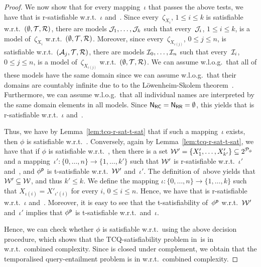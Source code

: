 \begin{proof}
    We now show that for every mapping~$\iota$ that passes the above tests, we
    have that \Wmc is r-satisfiable w.r.t.~$\iota$ and~\Kmc.
    Since every~$\zeta_{X_i}$, $1\le i\le k$ is satisfiable
    w.r.t.~$(\emptyset,\mathcal{T},\mathcal{R})$, there are models $\mathcal{J}_1,\dots,\mathcal{J}_k$ such
    that every~$\mathcal{J}_i$, $1\le i\le k$, is a model of~$\zeta_{X_i}$
    w.r.t.~$(\emptyset,\mathcal{T},\mathcal{R})$.  Moreover, since
    every~$\zeta_{X_{\iota(j)}}$, $0\le j\le n$, is satisfiable
    w.r.t.~$(\mathcal{A}_j,\mathcal{T},\mathcal{R})$, there are models
    $\mathcal{I}_0,\dots,\mathcal{I}_n$ such that every~$\mathcal{I}_i$, $0\le j\le n$, is a model
    of~$\zeta_{X_{\iota(j)}}$ w.r.t.~$(\emptyset,\mathcal{T},\mathcal{R})$.  We can assume
    w.l.o.g.\ that all of these models have the same domain since we can assume
    w.l.o.g.\ that their domains are countably infinite due to to the
    Löwenheim-Skolem theorem~\cite{Loe-MA15,Sko-VS20}.  Furthermore, we can
    assume w.l.o.g.\ that all individual names are interpreted by the same
    domain elements in all models.  Since $\mathsf{N_{RC}}=\mathsf{N_{RR}}=\emptyset$, this yields
    that \Wmc is r-satisfiable w.r.t.~$\iota$ and~\Kmc.

    Thus, we have by Lemma~\ref{lem:tcq-r-sat-t-sat} that if such a
    mapping~$\iota$ exists, then $\phi$ is satisfiable w.r.t.~\Kmc.
    Conversely, again by Lemma~\ref{lem:tcq-r-sat-t-sat}, we have that if $\phi$ is
    satisfiable w.r.t.~\Kmc, then there is a set
    $\mathcal{W}'=\{X_1',\dots,X_{k'}'\}\subseteq 2^{\mathcal{P}_\phi}$ and a
    mapping~$\iota'\colon\{0,\dots,n\}\to\{1,\dots,k'\}$ such that $\mathcal{W}'$ is
    r-satisfiable w.r.t.~$\iota'$ and~\Kmc, and $\phi^\mathsf{p}$ is t-satisfiable
    w.r.t.~$\mathcal{W}'$ and~$\iota'$.  The definition of~\Wmc above yields that
    $\mathcal{W}'\subseteq\mathcal{W}$, and thus $k'\le k$.  We define the mapping
    $\iota\colon\{0,\dots,n\}\to\{1,\dots,k\}$ such that
    $X_{\iota(i)}=X'_{\iota'(i)}$ for every $i$, $0\le i\le n$.  Hence, we have
    that \Wmc is r-satisfiable w.r.t.~$\iota$ and~\Kmc.  Moreover, it is easy to
    see that the t-satisfiability of~$\phi^\mathsf{p}$ w.r.t.~$\mathcal{W}'$ and~$\iota'$
    implies that $\phi^\mathsf{p}$ is t-satisfiable w.r.t.~\Wmc and~$\iota$.

    Hence, we can check whether $\phi$ is satisfiable w.r.t.~\Kmc using the
    above decision procedure, which shows that the TCQ-satisfiability problem
    in~\SHQ is in \ExpTime w.r.t.\ combined complexity.  Since \ExpTime is
    closed under complement, we obtain that the temporalised query-entailment
    problem is in \ExpTime w.r.t.\ combined complexity.


\end{proof}
